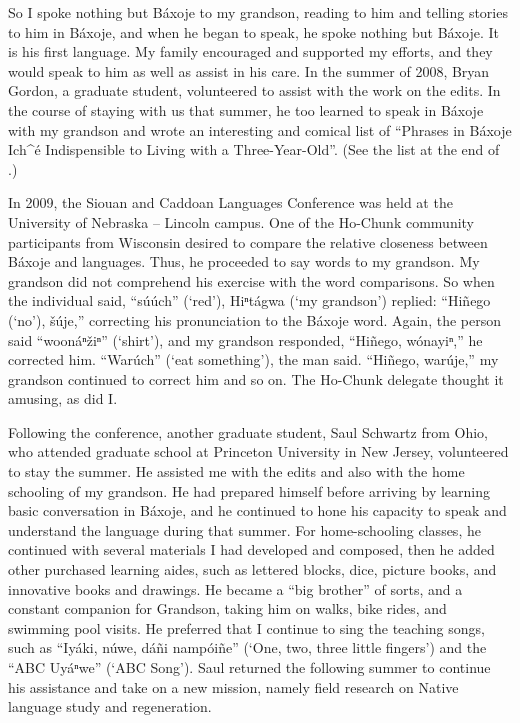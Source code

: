 \documentclass[output=paper]{LSP/langsci}
\begin{document}
So I spoke nothing but Báxoje to my grandson, reading to him and telling stories to him in Báxoje, and when he began to speak, he spoke nothing but Báxoje. It is his first language. My family encouraged and supported my efforts, and they would speak to him as well as assist in his care. In the summer of 2008, Bryan Gordon, a graduate student, volunteered to assist with the work on the  edits. In the course of staying with us that summer, he too learned to speak in Báxoje with my grandson and wrote an interesting and comical list of ``Phrases in Báxoje Ich\^{ }é Indispensible to Living with a Three-Year-Old''. (See the list at the end of .)

In 2009, the Siouan and Caddoan Languages Conference was held at the University of Nebraska -- Lincoln campus. One of the Ho-Chunk community participants from Wisconsin desired to compare the relative closeness between Báxoje and  languages. Thus, he proceeded to say  words to my grandson. My grandson did not comprehend his exercise with the word comparisons. So when the individual said, ``súúch'' (`red'), Hiⁿtágwa (`my grandson') replied: ``Hiñego (`no'), šúje,'' correcting his pronunciation to the Báxoje word. Again, the person said ``woonáⁿ\v{z}iⁿ'' (`shirt'), and my grandson responded, ``Hiñego, wónayiⁿ,'' he corrected him. ``Warúch'' (`eat something'), the man said. ``Hiñego, warúje,'' my grandson continued to correct him and so on. The Ho-Chunk delegate thought it amusing, as did I.

Following the conference, another graduate student, Saul Schwartz from Ohio, who attended graduate school at Princeton University in New Jersey, volunteered to stay the summer. He assisted me with the  edits and also with the home schooling of my grandson. He had prepared himself before arriving by learning basic conversation in Báxoje, and he continued to hone his capacity to speak and understand the language during that summer. For home-schooling classes, he continued with several materials I had developed and composed, then he added other purchased learning aides, such as lettered blocks, dice, picture books, and innovative books and drawings. He became a ``big brother'' of sorts, and a constant companion for Grandson, taking him on walks, bike rides, and swimming pool visits. He preferred that I continue to sing the teaching songs, such as ``Iyáki, núwe, dáñi nampóiñe'' (`One, two, three little fingers') and the ``ABC Uyáⁿwe'' (`ABC Song'). Saul returned the following summer to continue his assistance and take on a new mission, namely field research on Native language study and regeneration.  
\end{document}
